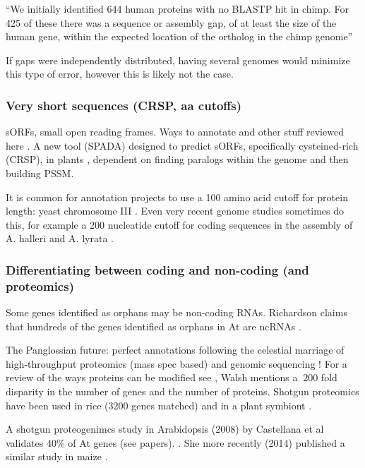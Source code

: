   ``We initially identified 644 human proteins with no BLASTP hit in chimp.
  For 425 of these there was a sequence or assembly gap, of at least the size
  of the human gene, within the expected location of the ortholog in the
  chimp genome'' \cite{knowles_recent_2009}

  If gaps were independently distributed, having several genomes would
  minimize this type of error, however this is likely not the case.

\subsubsection{Very short sequences (CRSP, aa cutoffs)}

sORFs, small open reading frames. Ways to annotate and other stuff reviewed
here \cite{andrews_emerging_2014}. A new tool (SPADA) designed to predict
sORFs, specifically cysteined-rich (CRSP), in plants \cite{zhou_detecting_2013},
dependent on finding paralogs within the genome and then building PSSM.

It is common for annotation projects to use a 100 amino acid cutoff for
protein length: yeast chromosome III \cite{oliver_complete_1992}. Even very
recent genome studies sometimes do this, for example a 200 nucleatide cutoff
for coding sequences in the assembly of A. halleri and A. lyrata
\cite{akama_genome-wide_2014}.

\subsubsection{Differentiating between coding and non-coding (and proteomics)}

  Some genes identified as orphans may be non-coding RNAs. Richardson claims
  that hundreds of the genes identified as orphans in At are ncRNAs
  \cite{richardson_analysis_2010}.

  The Panglossian future: perfect annotations following the celestial marriage
  of high-throughput proteomics (mass spec based) and genomic sequencing
  \cite{armengaud_perfect_2009, thelen_proteomic_2012}! For a review of the
  ways proteins can be modified see \cite{walsh_protein_2005}, Walsh mentions a
  $~200$ fold disparity in the number of genes and the number of proteins.
  Shotgun proteomics have been used in rice (3200 genes matched)
  \cite{helmy_oryzapg-db:_2011} and in a plant symbiont
  \cite{carlier_proteomics_2013}.

  A shotgun proteogenimcs study in Arabidopsis (2008) by Castellana et al
  \cite{castellana_discovery_2008} validates 40\% of At genes (see papers).
  \cite{castellana_automated_2014}. She more recently (2014) published a
  similar study in maize \cite{castellana_automated_2014}.

